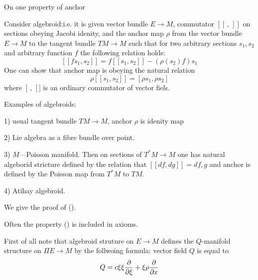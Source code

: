 
\def\p {\partial}

 On one property of anchor



    Consider algebroid:i.e. it is given vector bundle $E\to M$,
   commutator $[[\,,\,]]$ on sections obeying Jacobi idenity,
   and the anchor map $\rho$ from the vector bundle $E\to M$ to the
    tangent bundle $TM\to M$ such that for two arbitrary sections
  $s_1,s_2$ and arbitrary function $f$ the following relation holds:
                   $$
      [[fs_1, s_2]]=f[[s_1,s_2]]-\left(\rho (s_2)f\right)s_1
                   $$
    One can show that anchor map is obeying the natural relation
            $$
    \rho[[s_1,s_2]]=[\rho s_1,\rho s_2]
            $$ 
where $[\,,\,]]$ is an ordinary commutator of vector fiels.


Examples of algebroids:

1) usual tangent bundle $TM\to M$, anchor $\rho$ is idenity map


2) Lie algebra as a fibre bundle over point. 

3) $M$---Poisson manifold. Then on  sections of
$T^*M\to M$ one has natural algeborid stricture
defined by the relation that
 $[[df,dg]]=d{f,g}$ and anchor is defined by the Poisson map
from $T^*M$ to $TM$.


4) Atihay algebroid.


We give the proof of ().

Often the property () is included in axioms.


First of all note that algebroid struture on $E\to M$
defines the $Q$-manifold structure on $\Pi E\to M$
by the follwoing formula: vector field $Q$
is equal to
        $$
    Q=c\xi\xi {\p\over \p \xi}+\xi\rho {\p\over \p x}
        $$

  



\bye 
